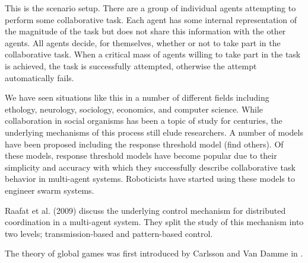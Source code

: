 \documentclass{nature}
\begin{document}
This is the scenario setup. There are a group of individual agents attempting to perform some collaborative task. Each agent has some internal representation of the magnitude of the task but does not share this information with the other agents. All agents decide, for themselves, whether or not to take part in the collaborative task. When a critical mass of agents willing to take part in the task is achieved, the task is successfully attempted, otherwise the attempt automatically fails.

We have seen situations like this in a number of different fields including ethology, neurology, sociology, economics, and computer science. While collaboration in social organisms has been a topic of study for centuries, the underlying mechanisms of this process still elude researchers. A number of models have been proposed including the response threshold model (find others). Of these models, response threshold models have become popular due to their simplicity and accuracy with which they successfully describe collaborative task behavior in multi-agent systems. Roboticists have started using these models to engineer swarm systems.

Raafat et al. (2009) discuss the underlying control mechanism for distributed coordination in a multi-agent system. They split the study of this mechanism into two levels; transmission-based and pattern-based control. 


The theory of global games was first introduced by Carlsson and Van Damme in \cite{Carlsson1993}.

\cite{Gordon1996}

\cite{Theraulaz1998}

\cite{Martinoli1999}

\cite{Bonabeau2000}
\end{document}
